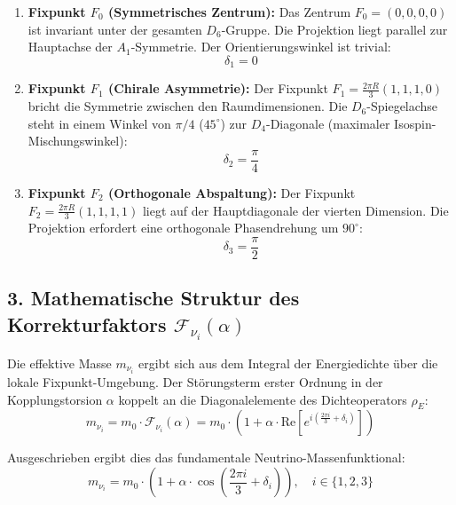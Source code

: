 \documentclass[11pt,a4paper]{article}
\begin{document}
	\begin{enumerate}
		\item \textbf{Fixpunkt $F_0$ (Symmetrisches Zentrum):} 
		Das Zentrum $F_0 = (0,0,0,0)$ ist invariant unter der gesamten $D_6$-Gruppe. Die Projektion liegt parallel zur Hauptachse der $A_1$-Symmetrie. Der Orientierungswinkel ist trivial:
		\begin{equation}
			\delta_1 = 0
		\end{equation}
		
		\item \textbf{Fixpunkt $F_1$ (Chirale Asymmetrie):} 
		Der Fixpunkt $F_1 = \frac{2\pi R}{3}(1,1,1,0)$ bricht die Symmetrie zwischen den Raumdimensionen. Die $D_6$-Spiegelachse steht in einem Winkel von $\pi/4$ ($45^\circ$) zur $D_4$-Diagonale (maximaler Isospin-Mischungswinkel):
		\begin{equation}
			\delta_2 = \frac{\pi}{4}
		\end{equation}
		
		\item \textbf{Fixpunkt $F_2$ (Orthogonale Abspaltung):} 
		Der Fixpunkt $F_2 = \frac{2\pi R}{3}(1,1,1,1)$ liegt auf der Hauptdiagonale der vierten Dimension. Die Projektion erfordert eine orthogonale Phasendrehung um $90^\circ$:
		\begin{equation}
			\delta_3 = \frac{\pi}{2}
		\end{equation}
	\end{enumerate}
	
	\subsection{3. Mathematische Struktur des Korrekturfaktors \texorpdfstring{$\mathcal{F}_{\nu_i}(\alpha)$}{F\_nu\_i(alpha)}}
	Die effektive Masse $m_{\nu_i}$ ergibt sich aus dem Integral der Energiedichte über die lokale Fixpunkt-Umgebung. Der Störungsterm erster Ordnung in der Kopplungstorsion $\alpha$ koppelt an die Diagonalelemente des Dichteoperators $\rho_E$:
	\begin{equation}
		m_{\nu_i} = m_0 \cdot \mathcal{F}_{\nu_i}(\alpha) = m_0 \cdot \left( 1 + \alpha \cdot \text{Re}\left[ e^{i \left(\frac{2\pi i}{3} + \delta_i\right)} \right] \right)
	\end{equation}
	
	Ausgeschrieben ergibt dies das fundamentale Neutrino-Massenfunktional:
	\begin{equation}
		m_{\nu_i} = m_0 \cdot \left( 1 + \alpha \cdot \cos\left( \frac{2\pi i}{3} + \delta_i \right) \right), \quad i \in \{1, 2, 3\}
	\end{equation}
	
\end{document}
